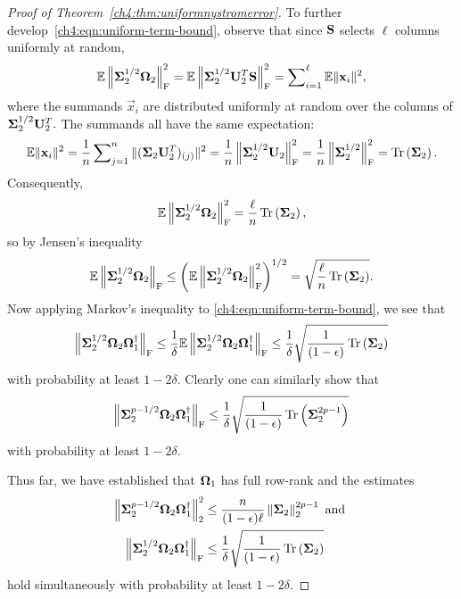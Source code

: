\begin{proof}[Proof of Theorem~\ref{ch4:thm:uniformnystromerror}]
 To further develop~\eqref{ch4:eqn:uniform-term-bound}, observe that since $\mathbf{S}$ selects $\ell$ columns uniformly at random,
\[
 \mathbb{E} \left\|\mathbf{\Sigma}_2^{1/2} \mathbf{\Omega}_2\right\|_\mathrm{F}^2 = \mathbb{E} \left\|\mathbf{\Sigma}_2^{1/2} \mathbf{U}_2^T \mathbf{S}\right\|_\mathrm{F}^2 = \sum\nolimits_{i=1}^\ell \mathbb{E} \|\mathbf{x}_i\|^2,
\]
where the summands $\vec{x}_i$ are distributed uniformly at 
random over the columns of $\mathbf{\Sigma}_2^{1/2} \mathbf{U}_2^T.$ 
The summands all have the same expectation:
\[
 \mathbb{E} \|\mathbf{x}_i\|^2 = \frac{1}{n} \sum\nolimits_{j=1}^n \| (\mathbf{\Sigma}_2 \mathbf{U}_2^T)_{(j)}\|^2
   = \frac{1}{n} \left\|\mathbf{\Sigma}_2^{1/2} \mathbf{U}_2\right\|_\mathrm{F}^2 = \frac{1}{n} \left\|\mathbf{\Sigma}_2^{1/2}\right\|_\mathrm{F}^2 = \operatorname{Tr}\left(\mathbf{\Sigma}_2\right).
\]
Consequently,
\[
 \mathbb{E} \left\|\mathbf{\Sigma}_2^{1/2} \mathbf{\Omega}_2\right\|_\mathrm{F}^2 = \frac{\ell}{n} \operatorname{Tr}\left(\mathbf{\Sigma}_2\right),
\]
so by Jensen's inequality
\[
 \mathbb{E} \left\|\mathbf{\Sigma}_2^{1/2} \mathbf{\Omega}_2\right\|_\mathrm{F} \leq 
   \left(\mathbb{E} \left\|\mathbf{\Sigma}_2^{1/2} \mathbf{\Omega}_2\right\|_\mathrm{F}^2\right)^{1/2} 
   = \sqrt{\frac{\ell}{n} \operatorname{Tr}\left(\mathbf{\Sigma}_2\right)}.
\]
Now applying Markov's inequality to \eqref{ch4:eqn:uniform-term-bound}, we see that
\[
 \left\|\mathbf{\Sigma}_2^{1/2} \mathbf{\Omega}_2 \mathbf{\Omega}_1^\dagger\right\|_\mathrm{F} 
   \leq \frac{1}{\delta} \mathbb{E} \left\|\mathbf{\Sigma}_2^{1/2} \mathbf{\Omega}_2 \mathbf{\Omega}_1^\dagger\right\|_\mathrm{F} 
   \leq \frac{1}{\delta} \sqrt{\frac{1}{(1-\epsilon)} \operatorname{Tr}\left(\mathbf{\Sigma}_2\right)}
\]
with probability at least $1 - 2\delta.$ Clearly one can similarly show that
\begin{equation}
 \left\|\mathbf{\Sigma}_2^{p-1/2} \mathbf{\Omega}_2 \mathbf{\Omega}_1^\dagger\right\|_\mathrm{F} 
   \leq \frac{1}{\delta} \sqrt{\frac{1}{(1-\epsilon)} \operatorname{Tr}\left(\mathbf{\Sigma}_2^{2p-1}\right)}
   \label{ch4:eqn:multipass-bound-for-nystrom-spectral}
\end{equation}
with probability at least $1 - 2\delta.$

Thus far, we have established that $\mathbf{\Omega}_1$ has full row-rank and the estimates
\begin{align}
\left\|\mathbf{\Sigma}_2^{p-1/2} \mathbf{\Omega}_2 \mathbf{\Omega}_1^\dagger\right\|_2^2 & \leq \frac{n}{(1-\epsilon)\ell} \left\|\mathbf{\Sigma}_2\right\|_2^{2p-1} \text{ and } 
 \label{ch4:eqn:nystrom-weak-spectral-norm-quantity-bound} \\
\left\|\mathbf{\Sigma}_2^{1/2} \mathbf{\Omega}_2 \mathbf{\Omega}_1^\dagger\right\|_\mathrm{F} & \leq \frac{1}{\delta} \sqrt{\frac{1}{(1-\epsilon)} \operatorname{Tr}\left(\mathbf{\Sigma}_2\right)}
 \label{ch4:eqn:nystrom-frob-quantity-bound}
\end{align}
hold simultaneously with probability at least $1- 2\delta.$


\end{proof}

